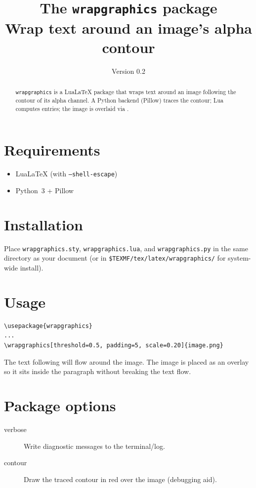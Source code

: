 \documentclass{article}
\title{The \texttt{wrapgraphics} package\\
  \large Wrap text around an image's alpha contour}
\author{}
\date{Version 0.2}
\begin{document}
\maketitle

\begin{abstract}
  \texttt{wrapgraphics} is a Lua\LaTeX{} package that wraps text around an
  image following the contour of its alpha channel. A Python backend
  (Pillow) traces the contour; Lua computes \texttt{\string\parshape} entries;
  the image is overlaid via \texttt{\string\rlap}.
\end{abstract}

\section{Requirements}

\begin{itemize}
  \item Lua\LaTeX{} (with \texttt{--shell-escape})
  \item Python~3 + Pillow
\end{itemize}

\section{Installation}

Place \texttt{wrapgraphics.sty}, \texttt{wrapgraphics.lua}, and
\texttt{wrapgraphics.py} in the same directory as your document
(or in \texttt{\$TEXMF/tex/latex/wrapgraphics/} for system-wide install).

\section{Usage}

\begin{Verbatim}
\usepackage{wrapgraphics}
...
\wrapgraphics[threshold=0.5, padding=5, scale=0.20]{image.png}
\end{Verbatim}

The text following \texttt{\string\wrapgraphics} will flow around the image.
The image is placed as an overlay so it sits inside the paragraph without
breaking the text flow.

\section{Package options}

\begin{description}
  \item[verbose]  Write diagnostic messages to the terminal/log.
  \item[contour]  Draw the traced contour in red over the image
                  (debugging aid).
\end{description}
\end{document}

